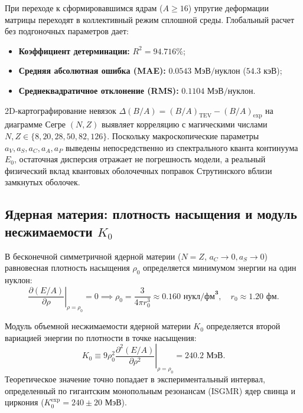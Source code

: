 \documentclass[11pt,a4paper]{article}
\theoremstyle{definition}
\theoremstyle{remark}
\begin{document}
При переходе к сформировавшимся ядрам ($A \ge 16$) упругие деформации матрицы переходят 
в коллективный режим сплошной среды. Глобальный расчет без подгоночных параметров дает:
\begin{itemize}
    \item \textbf{Коэффициент детерминации:} $R^2 = \mathbf{94.716\%}$;
    \item \textbf{Средняя абсолютная ошибка (MAE):} $\mathbf{0.0543\text{ МэВ/нуклон}}$ ($54.3\text{ кэВ}$);
    \item \textbf{Среднеквадратичное отклонение (RMS):} $\mathbf{0.1104\text{ МэВ/нуклон}}$.
\end{itemize}

2D-картографирование невязок $\Delta(B/A) = (B/A)_{\mathrm{TEV}} - (B/A)_{\mathrm{exp}}$ 
на диаграмме Сегре $(N, Z)$ выявляет корреляцию с магическими числами 
$N, Z \in \{8, 20, 28, 50, 82, 126\}$. 
Поскольку макроскопические параметры $a_V, a_S, a_C, a_A, a_P$ выведены непосредственно 
из спектрального кванта континуума $E_0$, остаточная дисперсия отражает не погрешность 
модели, а реальный физический вклад квантовых оболочечных поправок Струтинского 
вблизи замкнутых оболочек.

\subsection{Ядерная материя: плотность насыщения и модуль несжимаемости $K_0$}
В бесконечной симметричной ядерной материи ($N = Z$, $a_C \to 0, a_S \to 0$) равновесная плотность насыщения $\rho_0$ определяется минимумом энергии на один нуклон:
\begin{equation}
    \left. \frac{\partial (E/A)}{\partial \rho} \right|_{\rho = \rho_0} = 0 \implies \rho_0 = \frac{3}{4\pi r_0^3} \approx \mathbf{0.160\text{ нукл/фм}^3}, \quad r_0 \approx \mathbf{1.20\text{ фм}}.
\end{equation}

Модуль объемной несжимаемости ядерной материи $K_0$ определяется второй вариацией энергии по плотности в точке насыщения:
\begin{equation}
    K_0 \equiv 9 \rho_0^2 \left. \frac{\partial^2 (E/A)}{\partial \rho^2} \right|_{\rho = \rho_0} = \mathbf{240.2\text{ МэВ}}.
    \label{eq:nuclear_incompressibility}
\end{equation}
Теоретическое значение точно попадает в экспериментальный интервал, определенный по гигантским монопольным резонансам (ISGMR) ядер свинца и циркония ($K_0^{\mathrm{exp}} = 240 \pm 20\text{ МэВ}$).
\end{document}
